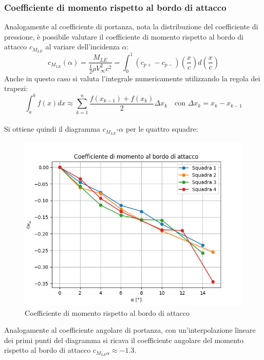 \subsubsection{Coefficiente di momento rispetto al bordo di attacco}
Analogamente al coefficiente di portanza, nota la distribuzione del coefficiente di pressione, è possibile valutare il coefficiente di momento rispetto al bordo di attacco $c_{M_{LE}}$ al variare dell'incidenza $\alpha$:
\begin{equation*}
    c_{M_{LE}}(\alpha) = \frac{M_{LE}}{\frac12 \rho V_\infty^2 c^2} = \int_0^1 (c_{p+}-c_{p-})\left( \frac xc \right) d \left( \frac xc \right)
\end{equation*}
Anche in questo caso si valuta l'integrale numericamente utilizzando la regola dei trapezi:
\begin{equation*}
    \int_a^b f(x)dx \approx \sum_{k=1}^n \frac{f(x_{k-1}) + f(x_k)}2 \Delta x_k \quad \text{con } \Delta x_k = x_k - x_{k-1}
\end{equation*}\\

\noindent Si ottiene quindi il diagramma $c_{M_{LE}}$-$\alpha$ per le quattro squadre:
\begin{figure}[H]
    \centering
    \includegraphics[width=.85\textwidth]{images/5/cmle.png}
    \caption{Coefficiente di momento rispetto al bordo di attacco}
\end{figure}

\noindent Analogamente al coefficiente angolare di portanza, con un'interpolazione lineare dei primi punti del diagramma si ricava il coefficiente angolare del momento rispetto al bordo di attacco $c_{M_{LE}\alpha} \approx -1.3$.

\newpage
